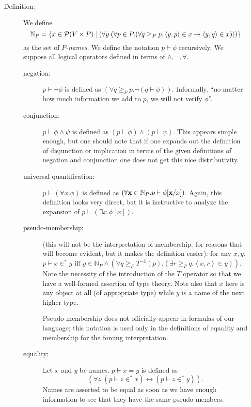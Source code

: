 \documentclass[12pt]{book}
\begin{document}
\begin{description}
\begin{description}

\item[Definition:] We define $${\mathbb N}_P = \{ x \in {\cal P}(V
\times P)\mid (\forall y.(\forall p \in P.(\forall q \geq_P
p.\left<y,p\right> \in x \rightarrow \left<y,q\right>\in x)))\}$$ as
the set of {\em $P$-names\/}.  We define the notation $p \vdash \phi$
recursively.  We suppose all logical operators defined in terms of
$\wedge, \neg, \forall$.

\begin{description}

\item[negation:] $p \vdash \neg\phi$ is defined as $(\forall q \geq_P
p.\neg(q \vdash \phi))$.  Informally, ``no matter how much information
we add to $p$, we will not verify $\phi$''.

\item[conjunction:] $p \vdash \phi \wedge \psi$ is defined as $(p
\vdash \phi) \wedge (p \vdash \psi)$.  This appears simple enough, but
one should note that if one expands out the definition of disjunction
or implication in terms of the given definitions of negation and
conjunction one does not get this nice distributivity.

\item[universal quantification:] $p \vdash (\forall x.\phi)$ is
defined as $(\forall {\bf x} \in {\mathbb N}_P.p \vdash \phi[{\bf
x}/x])$.  Again, this definition looks very direct, but it is
instructive to analyze the expansion of $p \vdash (\exists
x.\phi[x])$.

\item[pseudo-membership:] (this will not be the interpretation of
membership, for reasons that will become evident, but it makes the
definition easier): for any $x, y$, $p \vdash x \in^*
y$ iff $y \in {\mathbb N}_P \wedge (\forall q \geq_P T^{-1}(p).(\exists
r \geq_P q.\left<x,r\right> \in y))$.  Note the necessity of the
introduction of the $T$ operator so that we have a well-formed
assertion of type theory.  Note also that $x$ here is any object at
all (of appropriate type) while $y$ is a name of the next higher type.

Pseudo-membership does not officially appear in formulas of our
language; this notation is used only in the definitions of equality
and membership for the forcing interpretation.

\item[equality:] Let $x$ and $y$ be names.  $p \vdash x=y$ is defined
as $$(\forall z.(p \vdash z \in^* x) \leftrightarrow (p \vdash z \in ^*
y)).$$  Names are asserted to be equal as soon as we have enough
information to see that they have the same pseudo-members.


\end{description}
\end{description}
\end{description}
\end{document}
